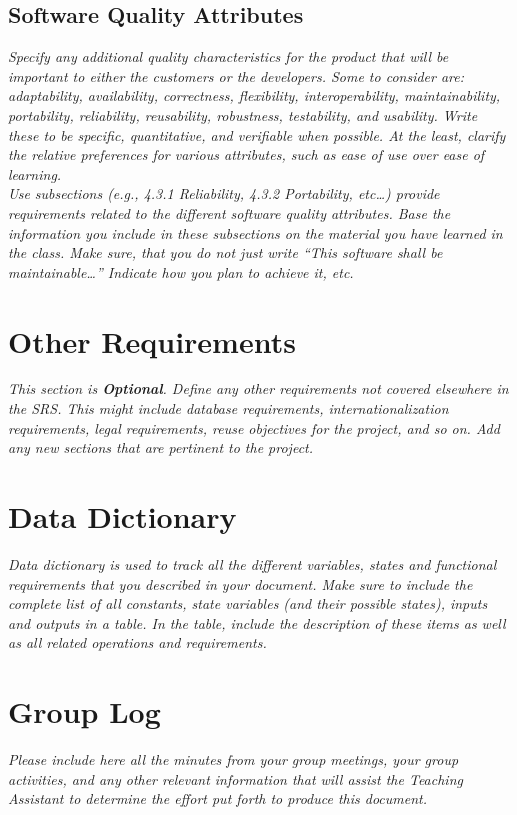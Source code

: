 \documentclass{article}
\newcommand{\gnl}{\vspace{1em}\\}      %
\begin{document}
    \subsection{Software Quality Attributes}
        \emph{Specify any additional quality characteristics for the product that will be important to either the customers or the developers. Some to consider are: adaptability, availability, correctness, flexibility, interoperability, maintainability, portability, reliability, reusability, robustness, testability, and usability. Write these to be specific, quantitative, and verifiable when possible. At the least, clarify the relative preferences for various attributes, such as ease of use over ease of learning.\gnl Use subsections (e.g., 4.3.1 Reliability, 4.3.2 Portability, etc\dots) provide requirements related to the different software quality attributes. Base the information you include in these subsections on the material you have learned in the class. Make sure, that you do not just write “This software shall be maintainable…” Indicate how you plan to achieve it, etc.}

\pagebreak
\section{Other Requirements}
    \emph{This section is \textbf{Optional}. Define any other requirements not covered elsewhere in the SRS. This might include database requirements, internationalization requirements, legal requirements, reuse objectives for the project, and so on. Add any new sections that are pertinent to the project.}

\pagebreak
\appendix

\section{Data Dictionary}
    \emph{Data dictionary is used to track all the different variables, states and functional requirements that you described in your document. Make sure to include the complete list of all constants, state variables (and their possible states), inputs and outputs in a table. In the table, include the description of these items as well as all related operations and requirements.}

\pagebreak
\section{Group Log}
    \emph{Please include here all the minutes from your group meetings, your group activities, and any other relevant information that will assist the Teaching Assistant to determine the effort put forth to produce this document.}
\end{document}
